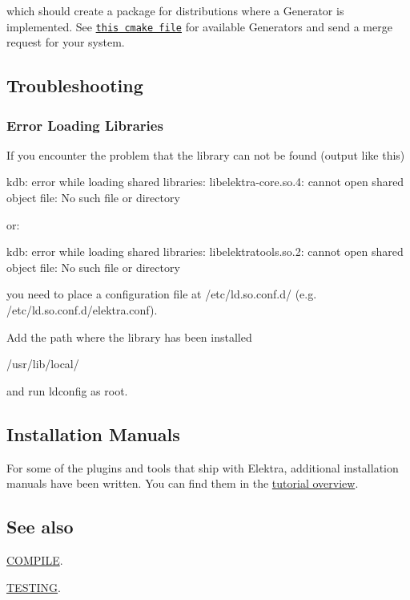 which should create a package for distributions where a Generator is implemented. See \href{/home/markus/Projekte/Elektra/current/cmake/ElektraPackaging.cmake}{\tt this cmake file} for available Generators and send a merge request for your system.

\subsection*{Troubleshooting}

\subsubsection*{Error Loading Libraries}

If you encounter the problem that the library can not be found (output like this) \begin{DoxyVerb}    kdb: error while loading shared libraries:
         libelektra-core.so.4: cannot open shared object file: No such file or directory
\end{DoxyVerb}


or\+: \begin{DoxyVerb}    kdb: error while loading shared libraries:
         libelektratools.so.2: cannot open shared object file: No such file or directory
\end{DoxyVerb}


you need to place a configuration file at {\ttfamily /etc/ld.so.\+conf.\+d/} (e.\+g. {\ttfamily /etc/ld.so.\+conf.\+d/elektra.conf}).

Add the path where the library has been installed \begin{DoxyVerb}    /usr/lib/local/
\end{DoxyVerb}


and run {\ttfamily ldconfig} as root.

\subsection*{Installation Manuals}

For some of the plugins and tools that ship with Elektra, additional installation manuals have been written. You can find them in the \hyperlink{md_doc_tutorials_README_doc_tutorials_README_md}{tutorial overview}.

\subsection*{See also}


\begin{DoxyItemize}
\item \hyperlink{doc_COMPILE_md}{C\+O\+M\+P\+I\+LE}.
\item \hyperlink{doc_TESTING_md}{T\+E\+S\+T\+I\+NG}. 
\end{DoxyItemize}